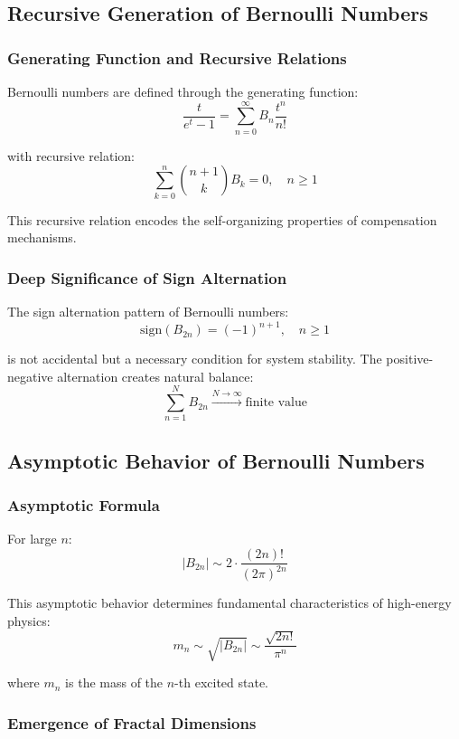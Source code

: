 \documentclass[11pt]{article}
\begin{document}
\subsection{Recursive Generation of Bernoulli Numbers}

\subsubsection{Generating Function and Recursive Relations}

Bernoulli numbers are defined through the generating function:
$$\frac{t}{e^t - 1} = \sum_{n=0}^{\infty} B_n \frac{t^n}{n!}$$

with recursive relation:
$$\sum_{k=0}^{n} \binom{n+1}{k} B_k = 0, \quad n \geq 1$$

This recursive relation encodes the self-organizing properties of compensation mechanisms.

\subsubsection{Deep Significance of Sign Alternation}

The sign alternation pattern of Bernoulli numbers:
$$\text{sign}(B_{2n}) = (-1)^{n+1}, \quad n \geq 1$$

is not accidental but a necessary condition for system stability. The positive-negative alternation creates natural balance:
$$\sum_{n=1}^{N} B_{2n} \xrightarrow{N \to \infty} \text{finite value}$$

\subsection{Asymptotic Behavior of Bernoulli Numbers}

\subsubsection{Asymptotic Formula}

For large $n$:
$$|B_{2n}| \sim 2 \cdot \frac{(2n)!}{(2\pi)^{2n}}$$

This asymptotic behavior determines fundamental characteristics of high-energy physics:
$$m_n \sim \sqrt{|B_{2n}|} \sim \frac{\sqrt{2n!}}{\pi^n}$$

where $m_n$ is the mass of the $n$-th excited state.

\subsubsection{Emergence of Fractal Dimensions}
\end{document}
